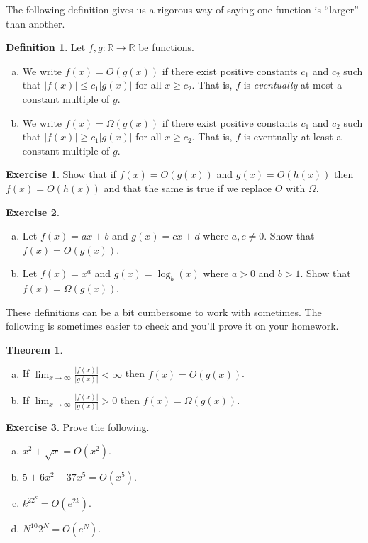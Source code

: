 \documentclass[11pt,letterpaper]{report}
\newcommand{\reals}{\mathbb{R}}
\theoremstyle{definition}
\newtheorem{definition}{Definition}
\newtheorem{exercise}{Exercise}
\newtheorem{theorem}{Theorem}
\begin{document}
The following definition gives us a rigorous way of saying one function is ``larger'' than another.
\begin{definition}
	Let $f,g:\reals\to \reals$ be functions.
	\begin{enumerate}[(a)]
		\item We write $f(x) = O(g(x))$ if there exist positive constants $c_1$ and $c_2$ such that $|f(x)| \leq c_1|g(x)|$ for all $x \geq c_2$. That is, $f$ is \textit{eventually} at most a constant multiple of $g$.
		\item We write $f(x) = \Omega(g(x))$ if there exist positive constants $c_1$ and $c_2$ such that $|f(x)| \geq c_1|g(x)|$ for all $x\geq c_2$. That is, $f$ is eventually at least a constant multiple of $g$.
	\end{enumerate}
\end{definition}

\begin{exercise}
	Show that if $f(x) = O(g(x))$ and $g(x) = O(h(x))$ then $f(x) = O(h(x))$ and that the same is true if we replace $O$ with $\Omega$.
\end{exercise}

\begin{exercise}
	\begin{enumerate}[(a)]
		\item Let $f(x) = ax+b$ and $g(x) = cx+d$ where $a,c\neq 0$. Show that $f(x) = O(g(x))$.
		\item Let $f(x) = x^a$ and $g(x) = \log_b(x)$ where $a>0$ and $b>1$. Show that $f(x) = \Omega(g(x))$.
	\end{enumerate}
\end{exercise}

These definitions can be a bit cumbersome to work with sometimes. The following is sometimes easier to check and you'll prove it on your homework.

\begin{theorem}
	\begin{enumerate}[(a)]
		\item If $\lim_{x\to \infty}\frac{|f(x)|}{|g(x)|}<\infty$ then $f(x) = O(g(x))$.
		\item If $\lim_{x\to \infty}\frac{|f(x)|}{|g(x)|} > 0$ then $f(x) = \Omega(g(x))$.
	\end{enumerate}
\end{theorem}

\begin{exercise}
	Prove the following.
	\begin{enumerate}[(a)]
		\item $x^2 + \sqrt{x} = O(x^2)$.
		\item $5+6x^2 - 37x^5 = O(x^5)$.
		\item $k^22^k = O(e^{2k})$.
		\item $N^{10}2^N = O(e^N)$.
	\end{enumerate}
\end{exercise}
\end{document}
